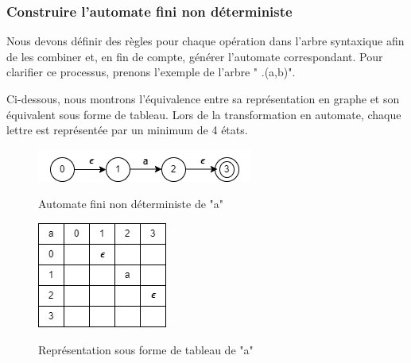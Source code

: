 \documentclass{article}
\begin{document}
\subsubsection{Construire l’automate fini non déterministe}
Nous devons définir des règles pour chaque opération dans l'arbre syntaxique afin de les combiner et, en fin de compte, générer l'automate correspondant. Pour clarifier ce processus, prenons l'exemple de l'arbre " .(a,b)".

Ci-dessous, nous montrons l'équivalence entre sa représentation en graphe et son équivalent sous forme de tableau. Lors de la transformation en automate, chaque lettre est représentée par un minimum de 4 états.

\begin{figure}[h]
    \begin{minipage}{0.3\textwidth}
        \centering
        \includegraphics[width=\textwidth]{resourse/NDFA_a.png}
        \caption{Automate fini non déterministe de "a"}
        \label{fig:ndfa_a}
        \cite{ndfa_a}
    \end{minipage}
    \hspace{5cm} %
    \begin{minipage}{0.25\textwidth}
        \centering
        \includegraphics[width=\textwidth]{resourse/NDFA_a.tab.png}
        \caption{Représentation sous forme de tableau de "a"}
        \label{fig:ndfa_tab_a}
        \cite{ndfa_tab_a}
    \end{minipage}
\end{figure}
\end{document}
